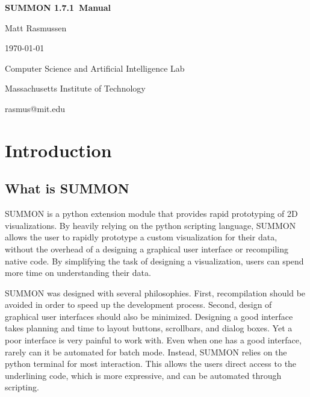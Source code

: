 \documentclass[12pt]{article}
\newcommand{\version}{1.7.1}
\begin{document}
\begin{titlepage}

\begin{center}

\vspace*{2.5in}

{\huge \bf {}\selectfont 
SUMMON \version\ Manual
}
\vspace*{.5in}

{\large
Matt Rasmussen

\today
}
\vspace*{.5in}

Computer Science and Artificial Intelligence Lab

Massachusetts Institute of Technology

\vspace*{.25in}

rasmus@mit.edu
\end{center}

\end{titlepage}


\tableofcontents

\clearpage

\section{Introduction}
\label{sec:intro}


\subsection{What is SUMMON}

SUMMON is a python extension module that provides rapid prototyping of 2D
visualizations.  By heavily relying on the python scripting language, SUMMON
allows the user to rapidly prototype a custom visualization for their data, 
without the overhead of a designing a graphical user interface or recompiling 
native code.  By simplifying the task of designing a visualization, users can 
spend more time on understanding their data. 

SUMMON was designed with several philosophies.  First, recompilation should
be avoided in order to speed up the development process.  Second, design of
graphical user interfaces should also be minimized.  Designing a good interface
takes planning and time to layout buttons, scrollbars, and dialog boxes.  Yet a 
poor interface is very painful to work with. Even when one has a good interface,
rarely can it be automated for batch mode.  Instead, SUMMON relies on the python
terminal for most interaction.  This allows the users direct access to  the
underlining code, which is more expressive, and can be automated through
scripting.  
\end{document}

